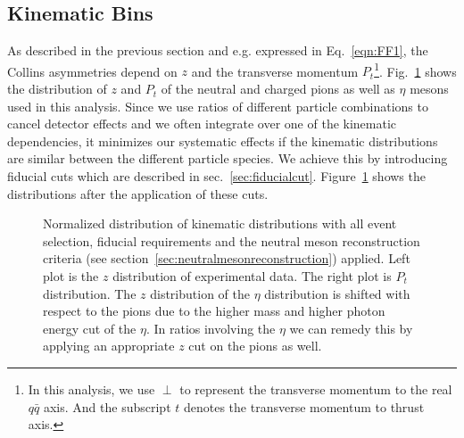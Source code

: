 \subsection{Kinematic Bins}
\label{sec:kinematicbins}
As described in the previous section and e.g. expressed in Eq.~\eqref{eqn:FF1}, the Collins asymmetries depend on $z$ and the transverse momentum $P_t$\footnote{In this analysis, we use $\perp$ to represent the transverse momentum to the real $q\bar{q}$ axis. And the subscript $t$ denotes the transverse momentum to thrust axis.}.  
Fig.~\ref{fig:zptdistri} shows the distribution of $z$ and $P_t$ of the neutral and charged pions as well as $\eta$ mesons used in this analysis. Since we use ratios of different particle combinations to cancel detector effects and we often integrate over one of the kinematic dependencies, it minimizes our systematic effects if the kinematic distributions are similar between the different particle species. We achieve this by introducing fiducial cuts which are described in sec.~\ref{sec:fiducialcut}. Figure~\ref{fig:zptdistri} shows the distributions after the application of these cuts.
\begin{figure}[H]
  \centering     
  \caption{Normalized distribution of kinematic distributions with all event selection, fiducial requirements and the neutral meson reconstruction criteria (see section~\ref{sec:neutralmesonreconstruction}) applied. Left plot is the $z$ distribution of experimental data. The right plot is $P_t$ distribution. The $z$ distribution of the $\eta$ distribution is shifted with respect to the pions due to the higher mass and higher photon energy cut of the $\eta$. In ratios involving the $\eta$ we can remedy this by applying an appropriate $z$ cut on the pions as well.}
  \label{fig:zptdistri}
\end{figure}

